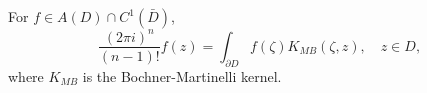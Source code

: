
For $f \in A(D) \cap C^1(\bar{D})$,
$$\frac{(2\pi i)^n}{(n-1)!} f(z) = \int_{\partial D} f(\zeta) K_{MB}(\zeta, z), \quad z \in D,$$
where $K_{MB}$ is the Bochner-Martinelli kernel.
